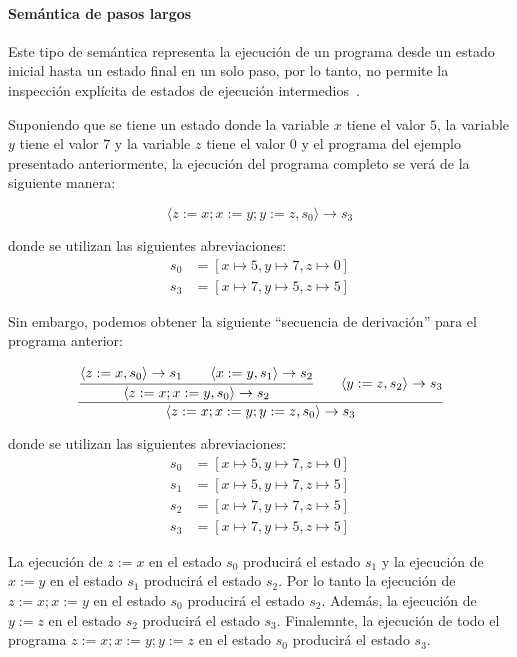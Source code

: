 \paragraph{Semántica de pasos largos}

Este tipo de semántica representa la ejecución de un programa desde un estado inicial hasta un estado final en un solo paso, por lo tanto, no permite la inspección explícita de estados de ejecución intermedios~\cite{nipkow}.

Suponiendo que se tiene un estado donde la variable $x$ tiene el valor $5$, la variable $y$ tiene el valor $7$ y la variable $z$ tiene el valor $0$ y el programa del ejemplo presentado anteriormente, la ejecución del programa completo se verá de la siguiente manera:

\begin{equation*}
\langle z:=x; x:=y; y:=z, s_{0} \rangle \rightarrow s_{3}
\end{equation*}

donde se utilizan las siguientes abreviaciones:
\begin{align*}
s_{0} &= [x\mapsto5, y\mapsto7, z\mapsto0]\\
s_{3} &= [x\mapsto7, y\mapsto5, z\mapsto5]
\end{align*}

Sin embargo, podemos obtener la siguiente ``secuencia de derivación'' para el programa anterior:

\begin{equation*}
\cfrac{
  \cfrac{\langle z:=x, s_{0}\rangle \rightarrow s_{1} \qquad \langle x:=y, s_{1} \rangle \rightarrow s_{2}}
    {\langle z:=x; x:=y, s_{0} \rangle \rightarrow s_{2}}
  \qquad
  \langle y:=z, s_{2} \rangle \rightarrow s_{3}
  }
  {\langle z:=x; x:=y; y:=z, s_{0} \rangle \rightarrow s_{3}}
\end{equation*}

donde se utilizan las siguientes abreviaciones:
\begin{align*}
s_{0} &= [x\mapsto5, y\mapsto7, z\mapsto0]\\
s_{1} &= [x\mapsto5, y\mapsto7, z\mapsto5]\\
s_{2} &= [x\mapsto7, y\mapsto7, z\mapsto5]\\
s_{3} &= [x\mapsto7, y\mapsto5, z\mapsto5]
\end{align*}

La ejecución de $z:=x$ en el estado $s_{0}$ producirá el estado $s_{1}$ y la ejecución de $x:=y$ en el estado $s_{1}$ producirá el estado $s_{2}$.
Por lo tanto la ejecución de $z:=x; x:=y$ en el estado $s_{0}$ producirá el estado $s_{2}$.
Además, la ejecución de $y:=z$ en el estado $s_{2}$ producirá el estado $s_{3}$.
Finalemnte, la ejecución de todo el programa $z:=x; x:=y; y:=z$ en el estado $s_{0}$ producirá el estado $s_{3}$.

